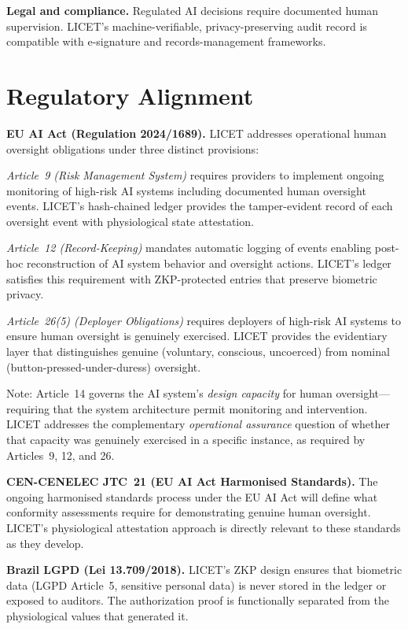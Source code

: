 \documentclass[12pt,a4paper]{article}
\begin{document}
\textbf{Legal and compliance.} Regulated AI decisions require documented human
supervision. LICET's machine-verifiable, privacy-preserving audit record is
compatible with e-signature and records-management frameworks.

\section{Regulatory Alignment}

\textbf{EU AI Act (Regulation 2024/1689).}
LICET addresses operational human oversight obligations under three distinct
provisions:

\textit{Article~9 (Risk Management System)} requires providers to implement
ongoing monitoring of high-risk AI systems including documented human oversight
events. LICET's hash-chained ledger provides the tamper-evident record of each
oversight event with physiological state attestation.

\textit{Article~12 (Record-Keeping)} mandates automatic logging of events
enabling post-hoc reconstruction of AI system behavior and oversight actions.
LICET's ledger satisfies this requirement with ZKP-protected entries that
preserve biometric privacy.

\textit{Article~26(5) (Deployer Obligations)} requires deployers of high-risk
AI systems to ensure human oversight is genuinely exercised. LICET provides
the evidentiary layer that distinguishes genuine (voluntary, conscious,
uncoerced) from nominal (button-pressed-under-duress) oversight.

Note: Article~14 governs the AI system's \emph{design capacity} for human
oversight---requiring that the system architecture permit monitoring and
intervention. LICET addresses the complementary \emph{operational assurance}
question of whether that capacity was genuinely exercised in a specific
instance, as required by Articles~9, 12, and 26.

\textbf{CEN-CENELEC JTC~21 (EU AI Act Harmonised Standards).} The ongoing
harmonised standards process under the EU AI Act will define what conformity
assessments require for demonstrating genuine human oversight. LICET's
physiological attestation approach is directly relevant to these standards as
they develop.

\textbf{Brazil LGPD (Lei 13.709/2018).} LICET's ZKP design ensures that
biometric data (LGPD Article~5, sensitive personal data) is never stored in
the ledger or exposed to auditors. The authorization proof is functionally
separated from the physiological values that generated it.
\end{document}
